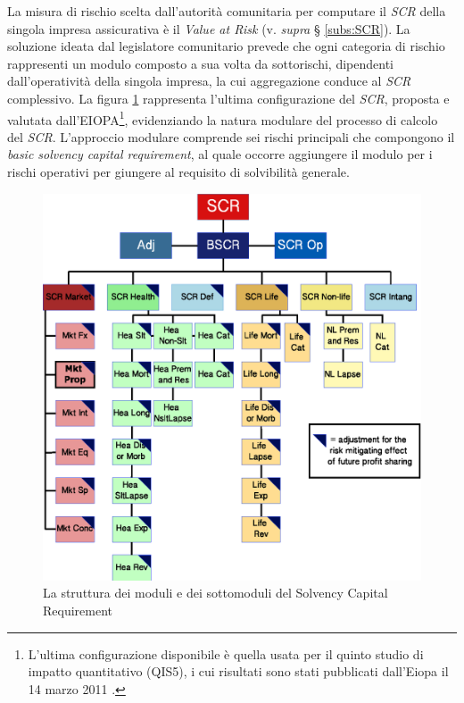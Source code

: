 La misura di rischio scelta dall'autorità comunitaria per computare il {\itshape SCR} della singola  impresa assicurativa è il {\itshape Value at Risk} (v. {\itshape supra} § \ref{subs:SCR}). 
La soluzione ideata dal legislatore comunitario prevede che ogni categoria di rischio rappresenti un modulo composto a sua volta da sottorischi, dipendenti dall'operatività della singola impresa, la cui aggregazione conduce al {\itshape SCR} complessivo.
La figura \ref{fig:SCR} rappresenta l'ultima configurazione del {\itshape SCR}, proposta e valutata dall'EIOPA\footnote{L'ultima configurazione disponibile è quella usata per il quinto studio di impatto quantitativo (QIS5), i cui risultati sono stati pubblicati dall'Eiopa il 14 marzo 2011 \cite{reportqis5}.},  evidenziando la natura modulare del processo di calcolo del {\itshape SCR}. L'approccio modulare comprende sei rischi principali che compongono il {\itshape basic solvency capital requirement}, al quale occorre aggiungere il modulo per i rischi operativi per giungere al requisito di solvibilità generale.
\begin{figure}[htbp]
\includegraphics[scale=1]{Immagini/StrutturaSCR.eps}
\caption[Struttura del \textit{SCR}]{La struttura dei moduli e dei sottomoduli del Solvency Capital Requirement}
\label{fig:SCR}
\end{figure} 

